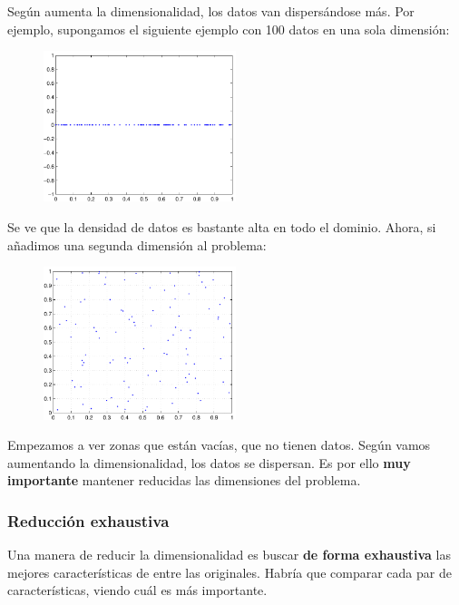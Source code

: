 \documentclass[11pt]{scrartcl}
\begin{document}
Según aumenta la dimensionalidad, los datos van dispersándose más. Por ejemplo,
supongamos el siguiente ejemplo con 100 datos en una sola dimensión:

\begin{figure}[h!]
  \centering
  \includegraphics[width=0.5\textwidth]{img/dimensionalidad_1}
\end{figure}

Se ve que la densidad de datos es bastante alta en todo el dominio. Ahora, si
añadimos una segunda dimensión al problema:

\begin{figure}[h!]
  \centering
  \includegraphics[width=0.5\textwidth]{img/dimensionalidad_2}
\end{figure}

Empezamos a ver zonas que están vacías, que no tienen datos. Según vamos
aumentando la dimensionalidad, los datos se dispersan. Es por ello \textbf{muy
  importante} mantener reducidas las dimensiones del problema.


\subsubsection{Reducción exhaustiva}

Una manera de reducir la dimensionalidad es buscar \textbf{de forma exhaustiva}
las mejores características de entre las originales. Habría que comparar cada
par de características, viendo cuál es más importante.
\end{document}
